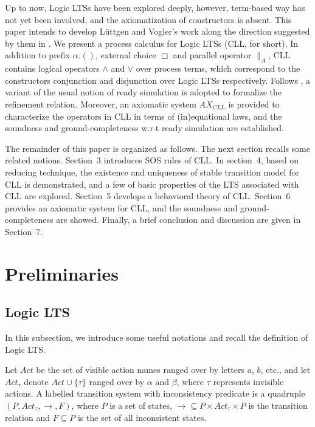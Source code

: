\documentclass{elsarticle}
\theoremstyle{plain}
\theoremstyle{definition}
\begin{document}
    Up to now, Logic LTSs have been explored deeply, however, term-based way has not yet been involved, and the axiomatization of constructors is absent.
    This paper intends to develop L\"{u}ttgen and Vogler's work along the direction suggested by them in \cite{Luttgen10}.
    We present a process calculus for Logic LTSs (CLL, for short). In addition to prefix $\alpha.()$, external choice $\Box$ and parallel operator $\parallel_A$, CLL contains logical operators $\wedge$ and $\vee$ over process terms, which correspond to the constructors conjunction and disjunction over Logic LTSs respectively.
    Follows \cite{Luttgen10}, a variant of the usual notion of ready simulation is adopted to formalize the refinement relation.
    Moreover, an axiomatic system $AX_{CLL}$ is provided to characterize the operators in CLL in terms of (in)equational laws, and the soundness and ground-completeness w.r.t ready simulation are established.


    The remainder of this paper is organized as follows. The next section recalls some related notions.
    Section~3 introduces SOS rules of CLL.
    In section~4, based on reducing technique, the existence and uniqueness of stable transition model for CLL is demonstrated, and a few of  basic properties of the LTS associated with CLL are explored.
    Section~5  develops a behavioral theory of CLL.
    Section~6 provides an axiomatic system for CLL, and the soundness and ground-completeness are showed.
    Finally, a brief conclusion and discussion are given in Section~7.

\section{Preliminaries}

\subsection{Logic LTS}

In this subsection, we introduce some useful notations and recall the definition of Logic LTS.

Let $Act$ be the set of visible action names ranged over by letters $a$, $b$, etc., and let $Act_{\tau}$ denote $Act \cup \{\tau\}$ ranged over by $\alpha$ and $\beta$, where $\tau$ represents invisible actions.
A labelled transition system with inconsistency predicate is a quadruple $(P,Act_{\tau},\longrightarrow,F)$, where $P$ is a set of states, $\longrightarrow \subseteq P\times Act_{\tau}\times P$ is the transition relation and $F\subseteq P$ is the set of all inconsistent states.
\end{document}
